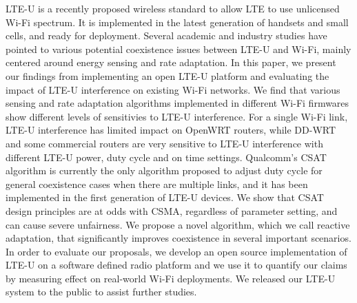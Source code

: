 LTE-U is a recently proposed wireless standard to
allow LTE to use unlicensed Wi-Fi spectrum. It is implemented
in the latest generation of handsets and small cells, and ready for
deployment. Several academic and industry studies have pointed
to various potential coexistence issues between LTE-U and Wi-Fi,
mainly centered around energy sensing and rate adaptation. 
In this paper, we present our findings from implementing 
an open LTE-U platform and evaluating the impact 
of LTE-U interference on existing Wi-Fi networks.
We find that various sensing and rate adaptation algorithms
implemented in different Wi-Fi firmwares show 
different levels of sensitivies to LTE-U interference. 
For a single Wi-Fi link, 
LTE-U interference has limited impact on OpenWRT routers, while
DD-WRT and some commercial routers are very sensitive to 
LTE-U interference with different LTE-U power, duty cycle and on time settings. 
Qualcomm’s CSAT algorithm is currently
the only algorithm proposed to adjust duty cycle for general
coexistence cases when there are multiple links, and it has been
implemented in the first generation of LTE-U devices. We show
that CSAT design principles are at odds with CSMA, regardless
of parameter setting, and can cause severe unfairness. We
propose a novel algorithm, which we call reactive adaptation, that
significantly improves coexistence in several important scenarios.
In order to evaluate our
proposals, we develop an open source implementation of LTE-U
on a software defined radio platform and we use it to quantify our
claims by measuring effect on real-world Wi-Fi deployments. We
released our LTE-U system to the public to assist further studies.






